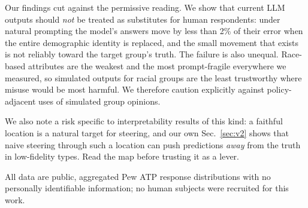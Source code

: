 Our findings cut against the permissive reading. We show that current
LLM outputs should \emph{not} be treated as substitutes for human
respondents: under natural prompting the model's answers move by less
than 2\% of their error when the entire demographic identity is replaced,
and the small movement that exists is not reliably toward the target
group's truth. The failure is also unequal. Race-based attributes are the
weakest and the most prompt-fragile everywhere we measured, so simulated
outputs for racial groups are the least trustworthy where
misuse would be most harmful. We therefore caution explicitly against
policy-adjacent uses of simulated group opinions.

We also note a risk specific to interpretability results of this kind: a
faithful location is a natural target for steering, and our own
Sec.~\ref{sec:v2} shows that naive steering through such a location can
push predictions \emph{away} from the truth in low-fidelity types. Read
the map before trusting it as a lever.

All data are public, aggregated Pew ATP response distributions with no
personally identifiable information; no human subjects were recruited for
this work.
